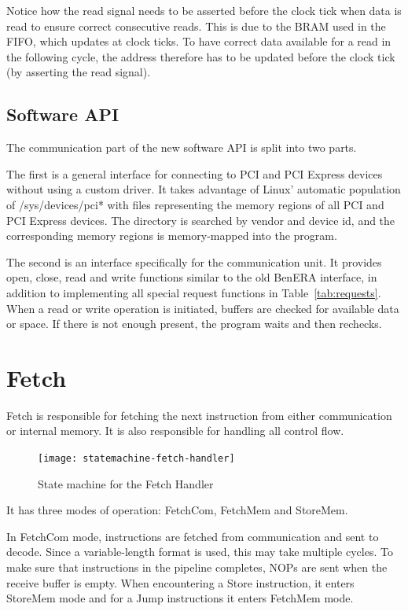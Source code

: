 Notice how the read signal needs to be asserted before the clock tick when data is read to ensure correct consecutive reads.
This is due to the BRAM used in the FIFO, which updates at clock ticks.
To have correct data available for a read in the following cycle, the address therefore has to be updated before the clock tick (by asserting the read signal).

\subsection{Software API}

The communication part of the new software API is split into two parts.

The first is a general interface for connecting to PCI and PCI Express devices without using a custom driver.
It takes advantage of Linux' automatic population of /sys/devices/pci* with files representing the memory regions of all PCI and PCI Express devices.
The directory is searched by vendor and device id, and the corresponding memory regions is memory-mapped into the program.

The second is an interface specifically for the communication unit.
It provides open, close, read and write functions similar to the old BenERA interface, in addition to implementing all special request functions in Table~\ref{tab:requests}.
When a read or write operation is initiated, buffers are checked for available data or space.
If there is not enough present, the program waits and then rechecks.

\section{Fetch}

Fetch is responsible for fetching the next instruction from either communication or internal memory.
It is also responsible for handling all control flow.

\begin{figure}[!ht]
    \centering
    \texttt{[image: statemachine-fetch-handler]}
    \caption{State machine for the Fetch Handler}
    \label{fig:implementation-simple}
\end{figure}

It has three modes of operation: FetchCom, FetchMem and StoreMem.

In FetchCom mode, instructions are fetched from communication and sent to decode.
Since a variable-length format is used, this may take multiple cycles.
To make sure that instructions in the pipeline completes, NOPs are sent when the receive buffer is empty.
When encountering a Store instruction, it enters StoreMem mode and for a Jump instructions it enters FetchMem mode.

